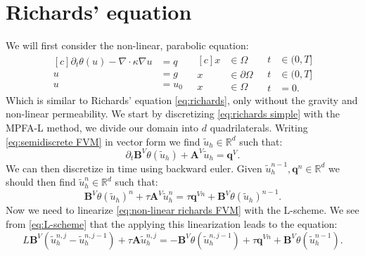 \documentclass[../Main/main.tex]{subfiles}
\begin{document}
	\section*{Richards' equation}
	We will first consider the non-linear, parabolic equation:
	\begin{equation}\label{eq:richards simple}
		\begin{aligned}[c]
			\partial_t \theta(u) - \nabla \cdot \kappa \nabla u &= q \\
			u &= g \\
			u &= u_0
		\end{aligned}
		\ \ \
		\begin{aligned}[c]
			x &\in \Omega  \\
			x &\in \partial \Omega \\
			x &\in \Omega  
		\end{aligned}
		\ \ \
		\begin{aligned}
			t&\in (0,T] \\
			t&\in (0,T] \\
			t&=0.
		\end{aligned}
	\end{equation}
	Which is similar to Richards' equation \eqref{eq:richards}, only without the gravity and non-linear permeability. We start by discretizing \eqref{eq:richards simple} with the MPFA-L method, we divide our domain into $d$ quadrilaterals. Writing \eqref{eq:semidiscrete FVM} in vector form we find $\tilde{u}_h \in \mathbb{R}^d$ such that:
	\begin{equation}
		\partial_t\pmb{B}^{V} \theta(\tilde{u}_h) + \pmb{A}^V \tilde{u}_h = \pmb{q}^V. 
	\end{equation}
	We can then discretize in time using backward euler. Given $ \tilde{u}_h^{n-1},\pmb{q}^n \in \mathbb{R}^d$ we should then find $ \tilde{u}_h^n \in \mathbb{R}^d$ such that: 
	\begin{equation} \label{eq:non-linear richards FVM}
		\pmb{B}^V  \theta(\tilde{u}_h)^n + \tau \pmb{A}^V \tilde{u}_h^n = \tau \pmb{q}^{Vn} + \pmb{B}^V  \theta(\tilde{u}_h)^{n-1}.
	\end{equation}
	Now we need to linearize \eqref{eq:non-linear richards FVM} with the L-scheme. We see from \eqref{eq:L-scheme} that the applying this linearization leads to the equation:
	\begin{equation}\label{eq:linearized richards fvm}
		L\pmb{B}^V(\tilde{u}^{n,j}_h-\tilde{u}^{n,j-1}_h) + \tau \pmb{A} \tilde{u}_h^{n,j} = -\pmb{B}^V \theta (\tilde{u}_h^{n,j-1})  + \tau \pmb{q}^{Vn} +  \pmb{B}^V \theta (\tilde{u}_h^{n-1}).
	\end{equation}
\end{document}
